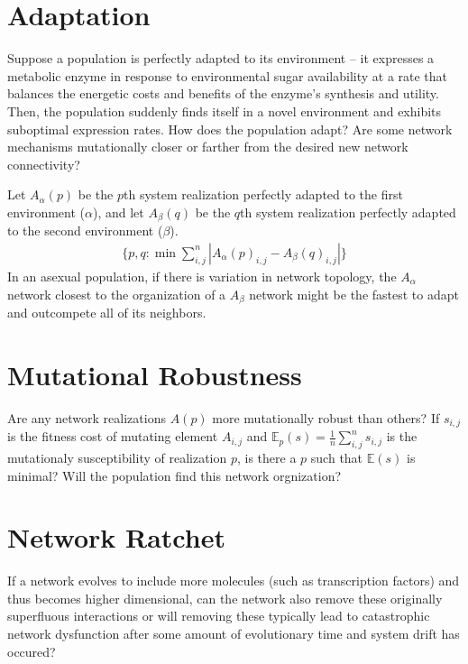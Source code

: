 \documentclass[11 pt]{article}
\begin{document}
\section{Adaptation}

Suppose a population is perfectly adapted to its environment -- it expresses a metabolic enzyme in response to environmental sugar availability at a rate that balances the energetic costs and benefits of the enzyme's synthesis and utility. Then, the population suddenly finds itself in a novel environment and exhibits suboptimal expression rates. How does the population adapt? Are some network mechanisms mutationally closer or farther from the desired new network connectivity? 

Let $A_{\alpha}(p)$ be the $p$th system realization perfectly adapted to the first environment ($\alpha$), and let $A_{\beta}(q)$ be the $q$th system realization perfectly adapted to the second environment ($\beta$). 
\begin{align*}
  \{p,q : \min \sum_{i,j}^{n} | A_{\alpha}(p)_{i,j} - A_{\beta}(q)_{i,j} | \}
\end{align*}
In an asexual population, if there is variation in network topology, the $A_{\alpha}$ network closest to the organization of a $A_{\beta}$ network might be the fastest to adapt and outcompete all of its neighbors.

\section{Mutational Robustness}

Are any network realizations $A(p)$ more mutationally robust than others? If $s_{i,j}$ is the fitness cost of mutating element $A_{i,j}$ and $\mathbb{E}_{p}(s) = \frac{1}{n}\displaystyle\sum_{i,j}^{n} s_{i,j}$ is the mutationaly susceptibility of realization $p$, is there a $p$ such that $\mathbb{E}(s)$ is minimal? Will the population find this network orgnization?

\section{Network Ratchet}

If a network evolves to include more molecules (such as transcription factors) and thus becomes higher dimensional, can the network also remove these originally superfluous interactions or will removing these typically lead to catastrophic network dysfunction after some amount of evolutionary time and system drift has occured? 
\end{document}
